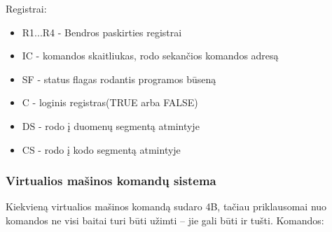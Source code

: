 \documentclass[oneside]{VUMIFPSkursinis}
\begin{document}
Registrai:
\begin{itemize}
	\item{R1...R4 - Bendros paskirties registrai}
	\item{IC - komandos skaitliukas, rodo sekančios komandos adresą }
	\item{SF - status flagas rodantis programos būseną}
	\item{C - loginis registras(TRUE arba FALSE)}
	\item{DS - rodo į duomenų segmentą atmintyje}
	\item{CS - rodo į kodo segmentą atmintyje}
\end{itemize}
	\subsubsection{Virtualios mašinos komandų sistema}
Kiekvieną virtualios mašinos komandą sudaro 4B, tačiau priklausomai nuo komandos ne visi
baitai turi būti užimti – jie gali būti ir tušti.
Komandos:
\end{document}
